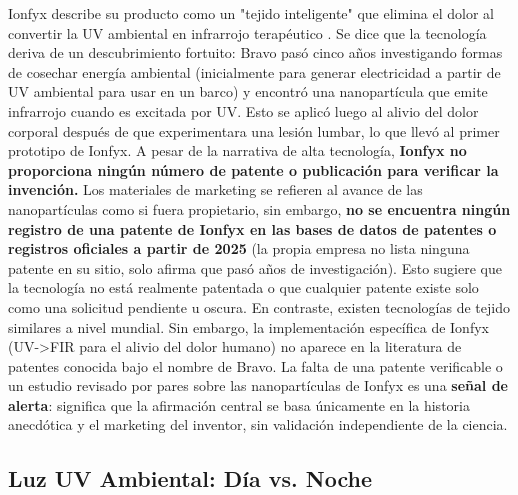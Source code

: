\documentclass{article}
\begin{document}
Ionfyx describe su producto como un "tejido inteligente" que elimina el dolor al convertir la UV ambiental en infrarrojo terapéutico \cite{ionfyx_sobre}. Se dice que la tecnología deriva de un descubrimiento fortuito: Bravo pasó cinco años investigando formas de cosechar energía ambiental (inicialmente para generar electricidad a partir de UV ambiental para usar en un barco) y encontró una nanopartícula que emite infrarrojo cuando es excitada por UV. Esto se aplicó luego al alivio del dolor corporal después de que experimentara una lesión lumbar, lo que llevó al primer prototipo de Ionfyx. A pesar de la narrativa de alta tecnología, \textbf{Ionfyx no proporciona ningún número de patente o publicación para verificar la invención.} Los materiales de marketing se refieren al avance de las nanopartículas como si fuera propietario, sin embargo, \textbf{no se encuentra ningún registro de una patente de Ionfyx en las bases de datos de patentes o registros oficiales a partir de 2025} (la propia empresa no lista ninguna patente en su sitio, solo afirma que pasó años de investigación). Esto sugiere que la tecnología no está realmente patentada o que cualquier patente existe solo como una solicitud pendiente u oscura. En contraste, existen tecnologías de tejido similares a nivel mundial. Sin embargo, la implementación específica de Ionfyx (UV->FIR para el alivio del dolor humano) no aparece en la literatura de patentes conocida bajo el nombre de Bravo. La falta de una patente verificable o un estudio revisado por pares sobre las nanopartículas de Ionfyx es una \textbf{señal de alerta}: significa que la afirmación central se basa únicamente en la historia anecdótica y el marketing del inventor, sin validación independiente de la ciencia.

\subsection{Luz UV Ambiental: Día vs. Noche}
\end{document}
